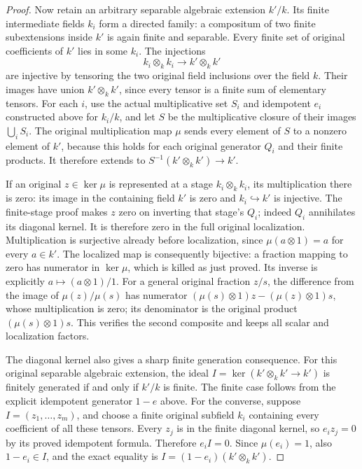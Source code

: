 \begin{proof}
Now retain an arbitrary separable algebraic
extension $k'/k$. Its finite intermediate
fields $k_i$ form a directed family: a
compositum of two finite subextensions
inside $k'$ is again finite and separable.
Every finite set of original coefficients
of $k'$ lies in some $k_i$. The injections
$$
k_i\otimes_kk_i\longrightarrow k'\otimes_kk'
$$
are injective by tensoring the two original
field inclusions over the field $k$.
Their images have union $k'\otimes_kk'$,
since every tensor is a finite sum of
elementary tensors. For each $i$, use the
actual multiplicative set $S_i$ and
idempotent $e_i$ constructed above for
$k_i/k$, and let $S$ be the multiplicative
closure of their images $\bigcup_iS_i$.
The original multiplication map $\mu$
sends every element of $S$ to a nonzero
element of $k'$, because this holds for
each original generator $Q_i$ and their
finite products. It therefore extends to
$S^{-1}(k'\otimes_kk')\to k'$.

If an original $z\in\ker\mu$ is represented
at a stage $k_i\otimes_kk_i$, its multiplication
there is zero: its image in the containing
field $k'$ is zero and $k_i\hookrightarrow k'$
is injective. The finite-stage proof makes
$z$ zero on inverting that stage's $Q_i$;
indeed $Q_i$ annihilates its diagonal kernel.
It is therefore zero in the full original
localization. Multiplication is surjective
already before localization, since
$\mu(a\otimes1)=a$ for every $a\in k'$.
The localized map is consequently bijective:
a fraction mapping to zero has numerator
in $\ker\mu$, which is killed as just proved.
Its inverse is explicitly
$a\mapsto(a\otimes1)/1$.
For a general original fraction $z/s$,
the difference from the image of
$\mu(z)/\mu(s)$ has numerator
$(\mu(s)\otimes1)z-(\mu(z)\otimes1)s$,
whose multiplication is zero; its denominator
is the original product $(\mu(s)\otimes1)s$.
This verifies the second composite and
keeps all scalar and localization factors.

\medskip\noindent
The diagonal kernel also gives a sharp finite
generation consequence. For this original
separable algebraic extension, the ideal
$I=\ker(k'\otimes_kk'\to k')$ is finitely
generated if and only if $k'/k$ is finite.
The finite case follows from the explicit
idempotent generator $1-e$ above.
For the converse, suppose
$I=(z_1,\ldots,z_m)$, and choose a finite
original subfield $k_i$ containing every
coefficient of all these tensors.
Every $z_j$ is in the finite diagonal
kernel, so $e_i z_j=0$ by its proved
idempotent formula. Therefore $e_iI=0$.
Since $\mu(e_i)=1$, also $1-e_i\in I$,
and the exact equality is
$I=(1-e_i)(k'\otimes_kk')$.


\end{proof}
